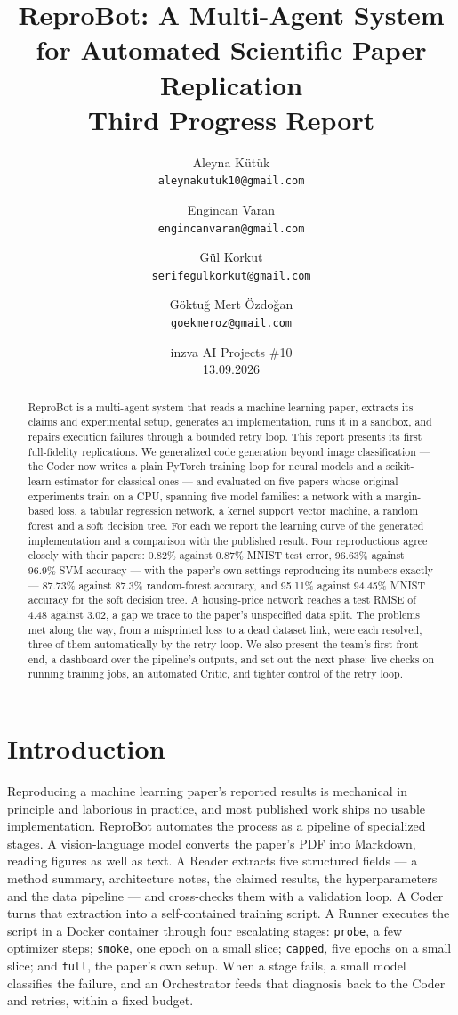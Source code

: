 \documentclass[11pt]{article}
\title{\textbf{ReproBot: A Multi-Agent System for Automated Scientific Paper Replication}\\[0.4em]
\large Third Progress Report}
\author{
  Aleyna Kütük \\ \small\texttt{aleynakutuk10@gmail.com}
  \and
  Engincan Varan \\ \small\texttt{engincanvaran@gmail.com}
  \and
  Gül Korkut \\ \small\texttt{serifegulkorkut@gmail.com}
  \and
  Göktuğ Mert Özdoğan \\ \small\texttt{goekmeroz@gmail.com}
}
\date{inzva AI Projects \#10 \\ 13.09.2026}
\begin{document}
\maketitle

\begin{abstract}
ReproBot is a multi-agent system that reads a machine learning paper, extracts its claims and
experimental setup, generates an implementation, runs it in a sandbox, and repairs execution
failures through a bounded retry loop. This report presents its first full-fidelity
replications. We generalized code generation beyond image classification --- the Coder now
writes a plain PyTorch training loop for neural models and a scikit-learn estimator for
classical ones --- and evaluated on five papers whose original experiments train on a CPU,
spanning five model families: a network with a margin-based loss, a tabular regression network,
a kernel support vector machine, a random forest and a soft decision tree. For each we report
the learning curve of the generated implementation and a comparison with the published result.
Four reproductions agree closely with their papers: 0.82\% against 0.87\% MNIST test error, 96.63\% against 96.9\% SVM accuracy --- with the paper's own settings reproducing its numbers exactly --- 87.73\% against 87.3\% random-forest accuracy, and 95.11\% against 94.45\% MNIST accuracy for the soft decision tree. A housing-price network reaches a test RMSE of 4.48 against 3.02, a gap we
trace to the paper's unspecified data split. The problems met along the way, from a misprinted
loss to a dead dataset link, were each resolved, three of them automatically by the retry loop.
We also present the team's first front end, a dashboard over the pipeline's outputs, and set out
the next phase: live checks on running training jobs, an automated Critic, and tighter control of
the retry loop.
\end{abstract}

\section{Introduction}
\label{sec:intro}

Reproducing a machine learning paper's reported results is mechanical in principle and
laborious in practice, and most published work ships no usable implementation. ReproBot
automates the process as a pipeline of specialized stages. A vision-language model converts
the paper's PDF into Markdown, reading figures as well as text. A Reader extracts five
structured fields --- a method summary, architecture notes, the claimed results, the
hyperparameters and the data pipeline --- and cross-checks them with a validation loop. A Coder
turns that extraction into a self-contained training script. A Runner executes the script in a
Docker container through four escalating stages: \texttt{probe}, a few optimizer steps;
\texttt{smoke}, one epoch on a small slice; \texttt{capped}, five epochs on a small slice; and
\texttt{full}, the paper's own setup. When a stage fails, a small model classifies the failure,
and an Orchestrator feeds that diagnosis back to the Coder and retries, within a fixed budget.
\end{document}

